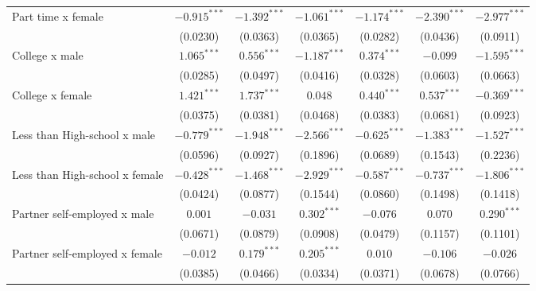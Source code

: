 \begin{tabular}{l|ccc|ccc}
Part time x female                     &  $-0.915^{***}$ &  $-1.392^{***}$ &  $-1.061^{***}$ &           $-1.174^{***}$ &  $-2.390^{***}$ &  $-2.977^{***}$ \\
                                       &        (0.0230) &        (0.0363) &        (0.0365) &                 (0.0282) &        (0.0436) &        (0.0911) \\
College x male                         &   $1.065^{***}$ &   $0.556^{***}$ &  $-1.187^{***}$ &            $0.374^{***}$ &        $-0.099$ &  $-1.595^{***}$ \\
                                       &        (0.0285) &        (0.0497) &        (0.0416) &                 (0.0328) &        (0.0603) &        (0.0663) \\
College x female                       &   $1.421^{***}$ &   $1.737^{***}$ &         $0.048$ &            $0.440^{***}$ &   $0.537^{***}$ &  $-0.369^{***}$ \\
                                       &        (0.0375) &        (0.0381) &        (0.0468) &                 (0.0383) &        (0.0681) &        (0.0923) \\
Less than High-school x male           &  $-0.779^{***}$ &  $-1.948^{***}$ &  $-2.566^{***}$ &           $-0.625^{***}$ &  $-1.383^{***}$ &  $-1.527^{***}$ \\
                                       &        (0.0596) &        (0.0927) &        (0.1896) &                 (0.0689) &        (0.1543) &        (0.2236) \\
Less than High-school x female         &  $-0.428^{***}$ &  $-1.468^{***}$ &  $-2.929^{***}$ &           $-0.587^{***}$ &  $-0.737^{***}$ &  $-1.806^{***}$ \\
                                       &        (0.0424) &        (0.0877) &        (0.1544) &                 (0.0860) &        (0.1498) &        (0.1418) \\
Partner self-employed x male           &         $0.001$ &        $-0.031$ &   $0.302^{***}$ &                 $-0.076$ &         $0.070$ &   $0.290^{***}$ \\
                                       &        (0.0671) &        (0.0879) &        (0.0908) &                 (0.0479) &        (0.1157) &        (0.1101) \\
Partner self-employed x female         &        $-0.012$ &   $0.179^{***}$ &   $0.205^{***}$ &                  $0.010$ &        $-0.106$ &        $-0.026$ \\
                                       &        (0.0385) &        (0.0466) &        (0.0334) &                 (0.0371) &        (0.0678) &        (0.0766) \\

\end{tabular}
